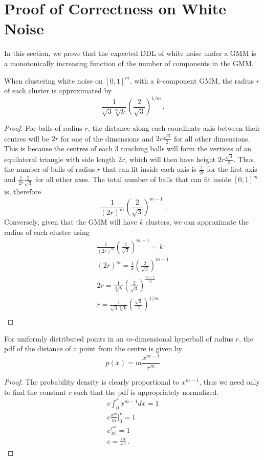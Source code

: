 \section{Proof of Correctness on White Noise}
In this section, we prove that the expected DDL of white noise under a GMM is a monotonically increasing function of the number of components in the GMM. 

\begin{lemma} \label{lemma:r}
When clustering white noise on $[0,1]^m$, with a $k$-component GMM, the radius $r$ of each cluster is approximated by 
 \begin{equation} \label{eq:r}
\frac{1}{\sqrt{3}\sqrt[m]{k}}\left(\frac{2}{\sqrt{3}}\right)^{1/m} \,.
\end{equation}
\end{lemma}
\begin{proof}
For balls of radius $r$, the distance along each coordinate axis between their centres will be $2r$ for one of the dimensions and $2r\frac{\sqrt{3}}{2}$ for all other dimensions. This is because the centres of each 3 touching balls will form the vertices of an equilateral triangle with side length $2r$, which will then have height $2r\frac{\sqrt{3}}{2}$. Thus, the number of balls of radius $r$ that can fit inside each axis is $\frac{1}{2r}$ for the first axis and $\frac{1}{2r}\frac{2}{\sqrt{3}}$ for all other axes. The total number of balls that can fit inside $[0,1]^m$ is, therefore 
\[
\frac{1}{(2r)^m}\left(\frac{2}{\sqrt{3}}\right)^{m-1}\,.
\]
Conversely, given that the GMM will have $k$ clusters, we can approximate the radius of each cluster using 
\begin{gather*}
\frac{1}{(2r)^m}\left(\frac{2}{\sqrt{3}}\right)^{m-1} = k \\
(2r)^m = \frac{1}{k}\left(\frac{2}{\sqrt{3}}\right)^{m-1}  \\
2r = \frac{1}{\sqrt[m]{k}}\left(\frac{2}{\sqrt{3}}\right)^{\frac{m-1}{m}}  \\
r = \frac{1}{\sqrt{3}\sqrt[m]{k}}\left(\frac{\sqrt{3}}{2}\right)^{1/m}  \\
\end{gather*}
\end{proof}

\begin{proposition} \label{proposition:m-ball-pdf}
For uniformly distributed points in an $m$-dimensional hyperball of radius $r$, the pdf of the distance of a point from the centre is given by
\[
p(x) = m \frac{x^{m-1}}{r^m}
\]
\end{proposition}
\begin{proof}
The probability density is clearly proportional to $x^{m-1}$, thus we need only to find the constant $c$ such that the pdf is appropriately normalized. 
\begin{gather*}
    c\int_{0}^r x^{m-1}dx = 1 \\
    c \frac{x^m}{m} \big |_0^r = 1\\
    c \frac{r^m}{m} = 1\\
    c = \frac{m}{r^m} \,.
\end{gather*}
\end{proof}

